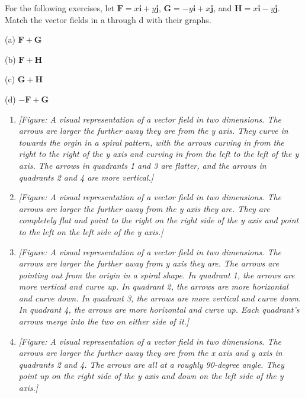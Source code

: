 \documentclass{exercises}
\begin{document}
For the following exercises, let $\mathbf{F}=x\mathbf{i}+y\mathbf{j}$, $\mathbf{G}=-y\mathbf{i}+x\mathbf{j}$, and $\mathbf{H}=x\mathbf{i}-y\mathbf{j}$. Match the vector fields in a through d with their graphs.


(a) $\mathbf{F}+\mathbf{G}$


(b) $\mathbf{F}+\mathbf{H}$


(c) $\mathbf{G}+\mathbf{H}$


(d) $-\mathbf{F}+\mathbf{G}$

\begin{enumerate}[resume]
\item \textit{[Figure: A visual representation of a vector field in two dimensions. The arrows are larger the further away they are from the y axis. They curve in towards the orgin in a spiral pattern, with the arrows curving in from the right to the right of the y axis and curving in from the left to the left of the y axis. The arrows in quadrants 1 and 3 are flatter, and the arrows in quadrants 2 and 4 are more vertical.]}
\item \textit{[Figure: A visual representation of a vector field in two dimensions. The arrows are larger the further away from the y axis they are. They are completely flat and point to the right on the right side of the y axis and point to the left on the left side of the y axis.]}
\item \textit{[Figure: A visual representation of a vector field in two dimensions. The arrows are larger the further away from y axis they are. The arrows are pointing out from the origin in a spiral shape. In quadrant 1, the arrows are more vertical and curve up. In quadrant 2, the arrows are more horizontal and curve down. In quadrant 3, the arrows are more vertical and curve down. In quadrant 4, the arrows are more horizontal and curve up. Each quadrant's arrows merge into the two on either side of it.]}
\item \textit{[Figure: A visual representation of a vector field in two dimensions. The arrows are larger the further away they are from the x axis and y axis in quadrants 2 and 4. The arrows are all at a roughly 90-degree angle. They point up on the right side of the y axis and down on the left side of the y axis.]}
\end{enumerate}
\end{document}
